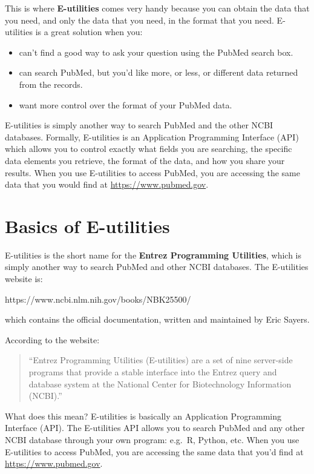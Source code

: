\documentclass[
]{book}
\begin{document}
This is where \textbf{E-utilities} comes very handy because you can obtain the data
that you need, and only the data that you need, in the format that you need.
E-utilities is a great solution when you:

\begin{itemize}
\item
  can't find a good way to ask your question using the PubMed search box.
\item
  can search PubMed, but you'd like more, or less, or different data returned
  from the records.
\item
  want more control over the format of your PubMed data.
\end{itemize}

E-utilities is simply another way to search PubMed and the other NCBI databases.
Formally, E-utilities is an Application Programming Interface (API) which allows
you to control exactly what fields you are searching, the specific data
elements you retrieve, the format of the data, and how you share your results.
When you use E-utilities to access PubMed, you are accessing the same
data that you would find at \url{https://www.pubmed.gov}.

\hypertarget{basics-of-e-utilities}{%
\section{Basics of E-utilities}\label{basics-of-e-utilities}}

E-utilities is the short name for the \textbf{Entrez Programming Utilities}, which
is simply another way to search PubMed and other NCBI databases. The
E-utilities website is:

https://www.ncbi.nlm.nih.gov/books/NBK25500/

which contains the official documentation, written and maintained by Eric Sayers.

According to the website:

\begin{quote}
``Entrez Programming Utilities (E-utilities) are a set of nine server-side
programs that provide a stable interface into the Entrez query and database
system at the National Center for Biotechnology Information (NCBI).''
\end{quote}

What does this mean? E-utilities is basically an Application Programming
Interface (API). The E-utilities API allows you to search PubMed and any other
NCBI database through your own program: e.g.~R, Python, etc. When you use
E-utilities to access PubMed, you are accessing the same data that you'd find
at \url{https://www.pubmed.gov}.
\end{document}
